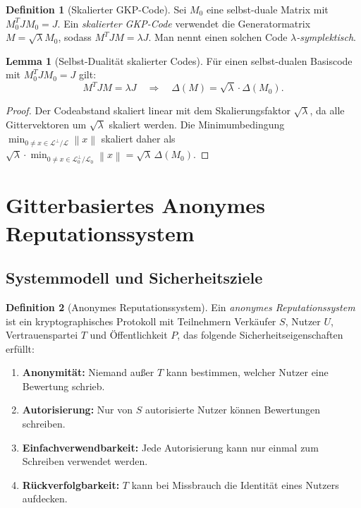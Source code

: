 ﻿\documentclass[a4paper,12pt]{article}
\theoremstyle{definition}
\newtheorem{definition}{Definition}
\newtheorem{lemma}{Lemma}
\newcommand{\Lat}{\mathcal{L}}
\newcommand{\norm}[1]{\left\|#1\right\|}
\begin{document}
\begin{definition}[Skalierter GKP-Code]
Sei $M_0$ eine selbst-duale Matrix mit $M_0^T J M_0 = J$.
Ein \emph{skalierter GKP-Code} verwendet die Generatormatrix
$M = \sqrt{\lambda} M_0$, sodass $M^T J M = \lambda J$.
Man nennt einen solchen Code \emph{$\lambda$-symplektisch}.
\end{definition}

\begin{lemma}[Selbst-Dualität skalierter Codes]
Für einen selbst-dualen Basiscode mit $M_0^T J M_0 = J$ gilt:
\[
    M^T J M = \lambda J \quad \Longrightarrow \quad \Delta(M) = \sqrt{\lambda} \cdot \Delta(M_0).
\]
\end{lemma}

\begin{proof}
Der Codeabstand skaliert linear mit dem Skalierungsfaktor $\sqrt{\lambda}$,
da alle Gittervektoren um $\sqrt{\lambda}$ skaliert werden.
Die Minimumbedingung $\min_{0 \neq x \in \Lat^\perp/\Lat}\norm{x}$ skaliert daher als
$\sqrt{\lambda} \cdot \min_{0 \neq x \in \Lat_0^\perp/\Lat_0}\norm{x} = \sqrt{\lambda}\,\Delta(M_0)$.
\end{proof}

\section{Gitterbasiertes Anonymes Reputationssystem}

\subsection{Systemmodell und Sicherheitsziele}

\begin{definition}[Anonymes Reputationssystem]
Ein \emph{anonymes Reputationssystem} ist ein kryptographisches Protokoll
mit Teilnehmern Verkäufer $S$, Nutzer $U$, Vertrauenspartei $T$ und Öffentlichkeit $P$,
das folgende Sicherheitseigenschaften erfüllt:
\begin{enumerate}
    \item \textbf{Anonymität:} Niemand außer $T$ kann bestimmen, welcher Nutzer eine Bewertung schrieb.
    \item \textbf{Autorisierung:} Nur von $S$ autorisierte Nutzer können Bewertungen schreiben.
    \item \textbf{Einfachverwendbarkeit:} Jede Autorisierung kann nur einmal zum Schreiben verwendet werden.
    \item \textbf{Rückverfolgbarkeit:} $T$ kann bei Missbrauch die Identität eines Nutzers aufdecken.
\end{enumerate}
\end{definition}
\end{document}
